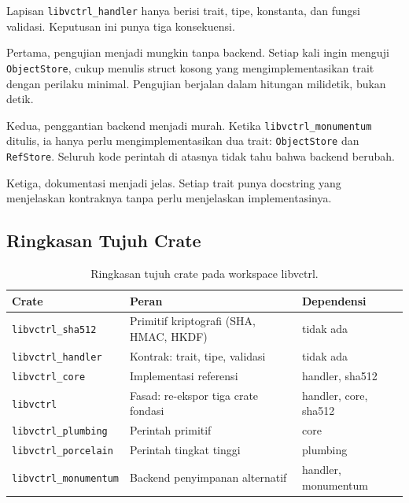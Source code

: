 \documentclass[11pt,a4paper]{article}
\begin{document}
Lapisan \texttt{libvctrl\_handler} hanya berisi trait, tipe, konstanta, dan fungsi validasi. Keputusan ini punya tiga konsekuensi.

Pertama, pengujian menjadi mungkin tanpa backend. Setiap kali ingin menguji \texttt{ObjectStore}, cukup menulis struct kosong yang mengimplementasikan trait dengan perilaku minimal. Pengujian berjalan dalam hitungan milidetik, bukan detik.

Kedua, penggantian backend menjadi murah. Ketika \texttt{libvctrl\_monumentum} ditulis, ia hanya perlu mengimplementasikan dua trait: \texttt{ObjectStore} dan \texttt{RefStore}. Seluruh kode perintah di atasnya tidak tahu bahwa backend berubah.

Ketiga, dokumentasi menjadi jelas. Setiap trait punya docstring yang menjelaskan kontraknya tanpa perlu menjelaskan implementasinya.

\subsection{Ringkasan Tujuh Crate}

\begin{table}[H]
	\centering
	\caption{Ringkasan tujuh crate pada workspace libvctrl.}
	\label{tab:crates}
	\footnotesize
	\begin{tabularx}{\textwidth}{l X X}
		\toprule
		Crate                         & Peran                                  & Dependensi            \\
		\midrule
		\texttt{libvctrl\_sha512}     & Primitif kriptografi (SHA, HMAC, HKDF) & tidak ada             \\
		\texttt{libvctrl\_handler}    & Kontrak: trait, tipe, validasi         & tidak ada             \\
		\texttt{libvctrl\_core}       & Implementasi referensi                 & handler, sha512       \\
		\texttt{libvctrl}             & Fasad: re-ekspor tiga crate fondasi    & handler, core, sha512 \\
		\texttt{libvctrl\_plumbing}   & Perintah primitif                      & core                  \\
		\texttt{libvctrl\_porcelain}  & Perintah tingkat tinggi                & plumbing              \\
		\texttt{libvctrl\_monumentum} & Backend penyimpanan alternatif         & handler, monumentum   \\
		\bottomrule
	\end{tabularx}
\end{table}
\end{document}
